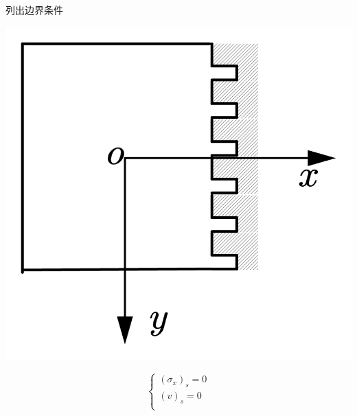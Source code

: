 \begin{example}
	列出边界条件
\end{example}
\centerline{\includegraphics[scale=0.5]{figure/2-16.png}}
	\begin{remark}
	\[\begin{cases}
	\left( \sigma _x \right) _s=0\\
	\left( v \right) _s=0\\
	\end{cases}\]
\end{remark}

